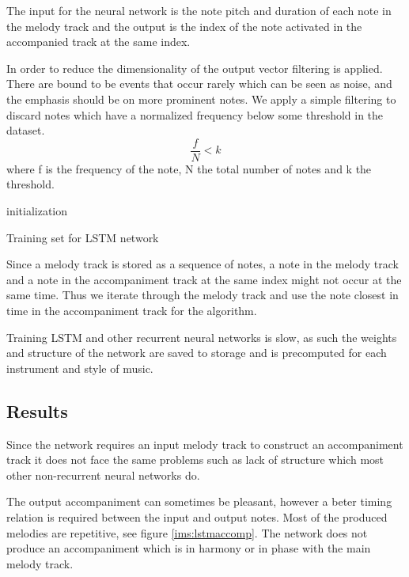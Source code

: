The input for the neural network is the note pitch and duration of each note in the melody track and the output is the index of the note activated in the accompanied track at the same index.

In order to reduce the dimensionality of the output vector filtering is applied. There are bound to be events that occur rarely which can be seen as noise, and the emphasis should be on more prominent notes.
We apply a simple filtering to discard notes which have a normalized frequency below some threshold in the dataset.
\[ \frac{f}{N} < k \]
where f is the frequency of the note, N the total number of notes and k the threshold.

\begin{algorithm}
 initialization\;
 
\caption{Training set for LSTM network}
\end{algorithm}
Since a melody track is stored as a sequence of notes, a note in the melody track and a note in the accompaniment track at the same index might not occur at the same time. Thus we iterate through the melody track and use the note closest in time in the accompaniment track for the algorithm.

Training \ac{LSTM} and other recurrent neural networks is slow, as such the weights and structure of the network are saved to storage and is precomputed for each instrument and style of music.

\subsection{Results}
Since the network requires an input melody track to construct an accompaniment track it does not face the same problems such as lack of structure which most other non-recurrent neural networks do.

The output accompaniment can sometimes be pleasant, however a beter timing relation is required between the input and output notes. Most of the produced melodies are repetitive, see figure \ref{ims:lstmaccomp}. The network does not produce an accompaniment which is in harmony or in phase with the main melody track.

